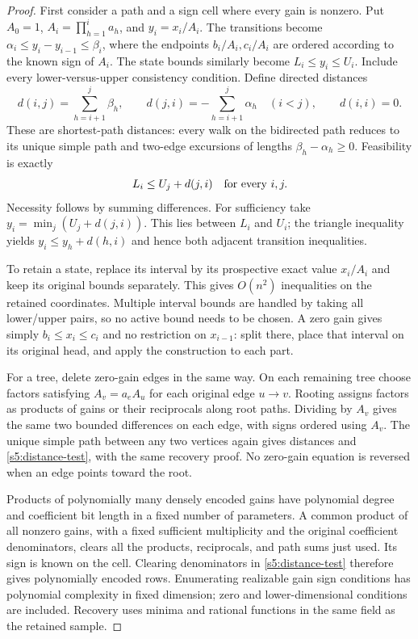 \begin{proof}
First consider a path and a sign cell where every gain is nonzero. Put
$A_0=1$, $A_i=\prod_{h=1}^i a_h$, and $y_i=x_i/A_i$. The transitions
become $\alpha_i\le y_i-y_{i-1}\le\beta_i$, where the endpoints
$b_i/A_i,c_i/A_i$ are ordered according to the known sign of $A_i$.
The state bounds similarly become $L_i\le y_i\le U_i$. Include every
lower-versus-upper consistency condition. Define directed distances
\[
 d(i,j)=\sum_{h=i+1}^j\beta_h,\qquad
 d(j,i)=-\sum_{h=i+1}^j\alpha_h\quad(i<j),\qquad d(i,i)=0.
\]
These are shortest-path distances: every walk on the bidirected path
reduces to its unique simple path and two-edge excursions of lengths
$\beta_h-\alpha_h\ge0$. Feasibility is exactly
\begin{equation}
 L_i\le U_j+d(j,i)\quad\hbox{for every }i,j.
 \label{s5:distance-test}
\end{equation}
Necessity follows by summing differences. For sufficiency take
$y_i=\min_j(U_j+d(j,i))$. This lies between $L_i$ and $U_i$; the
triangle inequality yields $y_i\le y_h+d(h,i)$ and hence both
adjacent transition inequalities.

To retain a state, replace its interval by its prospective exact value
$x_i/A_i$ and keep its original bounds separately. This gives
$O(n^2)$ inequalities on the retained coordinates. Multiple interval
bounds are handled by taking all lower/upper pairs, so no active
bound needs to be chosen. A zero gain gives simply $b_i\le x_i\le c_i$ and
no restriction on $x_{i-1}$: split there, place that interval on its
original head, and apply the construction to each part.

For a tree, delete zero-gain edges in the same way. On each
remaining tree choose factors satisfying $A_v=a_eA_u$ for each original
edge $u\to v$. Rooting assigns factors as products of gains or their
reciprocals along root paths. Dividing by $A_v$ gives the same two
bounded differences on each edge, with signs ordered using $A_v$.
The unique simple path between any two vertices again gives distances
and \eqref{s5:distance-test}, with the same recovery proof.
No zero-gain equation is reversed when an edge points toward the root.

Products of polynomially many densely encoded gains have polynomial
degree and coefficient bit length in a fixed number of parameters. A common product of
all nonzero gains, with a fixed sufficient multiplicity and the original
coefficient denominators, clears all the products, reciprocals, and
path sums just used. Its sign is known on the cell. Clearing denominators
in \eqref{s5:distance-test} therefore gives polynomially encoded rows.
Enumerating realizable gain sign conditions has polynomial complexity
in fixed dimension; zero and lower-dimensional conditions are included.
Recovery uses minima and rational functions in the same field as the
retained sample.


\end{proof}
